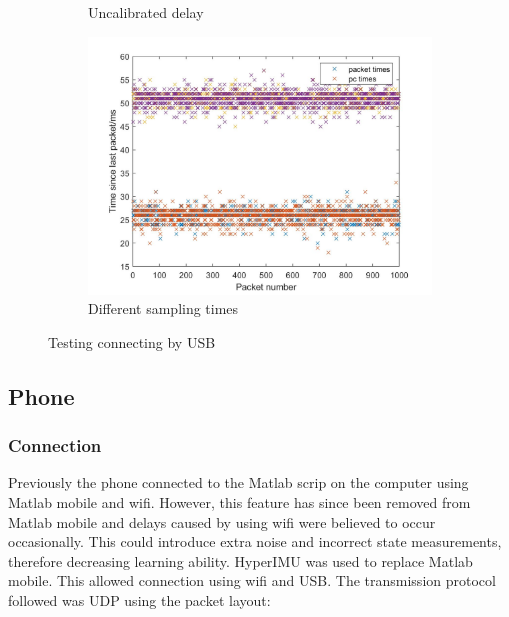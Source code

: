 \documentclass[twoside,twocolumn,12pt]{article}
\begin{document}
\begin{figure}[hb!]
\begin{subfigure}[t]{0.325\textwidth}
    \caption{Uncalibrated delay}
  \label{fig:td}
  \end{subfigure}
  \begin{subfigure}[t]{0.325\textwidth}
    \includegraphics[width=\linewidth]{both}
    \caption{Different sampling times}
  \label{fig:ts2}
  \end{subfigure}
  \caption{Testing connecting by USB}
  \label{fig:usb}
\end{figure}
\subsection{Phone}
\subsubsection{Connection}
Previously the phone connected to the Matlab scrip on the computer using Matlab mobile and wifi. However, this feature has since been removed from Matlab mobile and delays caused by using wifi were believed to occur occasionally. This could introduce extra noise and incorrect state measurements, therefore decreasing learning ability.
\newline
HyperIMU \cite{ianovir} was used to replace Matlab mobile. This allowed connection using wifi and USB. The transmission protocol followed was UDP using the packet layout:



\begin{align*}
[t, a_x, a_y ,a_z , \dot{\alpha}_x, \dot{\alpha}_y , \dot{\alpha}_z \#]
\end{align*}
\end{document}
